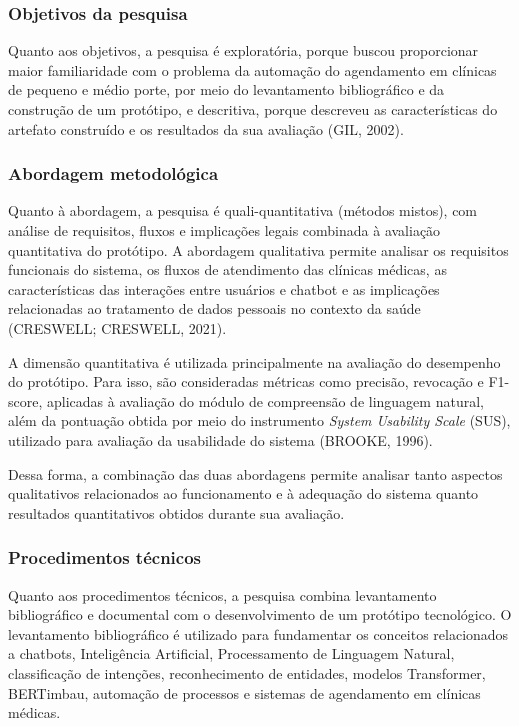 \documentclass[12pt,a4paper]{extarticle}
\begin{document}
\subsubsection{Objetivos da pesquisa}

Quanto aos objetivos, a pesquisa é exploratória, porque buscou proporcionar maior familiaridade com o problema da automação do agendamento em clínicas de pequeno e médio porte, por meio do levantamento bibliográfico e da construção de um protótipo, e descritiva, porque descreveu as características do artefato construído e os resultados da sua avaliação (GIL, 2002).

\subsubsection{Abordagem metodológica}

Quanto à abordagem, a pesquisa é quali-quantitativa (métodos mistos), com análise de requisitos, fluxos e implicações legais combinada à avaliação quantitativa do protótipo. A abordagem qualitativa permite analisar os requisitos funcionais do sistema, os fluxos de atendimento das clínicas médicas, as características das interações entre usuários e chatbot e as implicações relacionadas ao tratamento de dados pessoais no contexto da saúde (CRESWELL; CRESWELL, 2021).

A dimensão quantitativa é utilizada principalmente na avaliação do desempenho do protótipo. Para isso, são consideradas métricas como precisão, revocação e F1-score, aplicadas à avaliação do módulo de compreensão de linguagem natural, além da pontuação obtida por meio do instrumento \textit{System Usability Scale} (SUS), utilizado para avaliação da usabilidade do sistema (BROOKE, 1996).

Dessa forma, a combinação das duas abordagens permite analisar tanto aspectos qualitativos relacionados ao funcionamento e à adequação do sistema quanto resultados quantitativos obtidos durante sua avaliação.

\subsubsection{Procedimentos técnicos}

Quanto aos procedimentos técnicos, a pesquisa combina levantamento bibliográfico e documental com o desenvolvimento de um protótipo tecnológico. O levantamento bibliográfico é utilizado para fundamentar os conceitos relacionados a chatbots, Inteligência Artificial, Processamento de Linguagem Natural, classificação de intenções, reconhecimento de entidades, modelos Transformer, BERTimbau, automação de processos e sistemas de agendamento em clínicas médicas.
\end{document}
